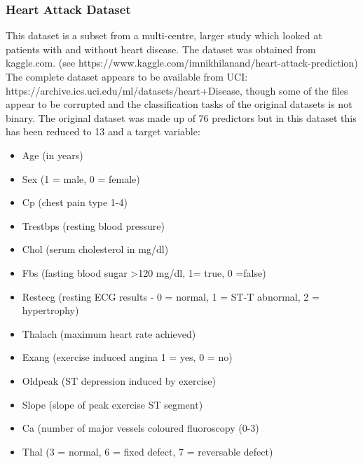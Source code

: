 \subsubsection{Heart Attack Dataset}
This dataset is a subset from a multi-centre, larger study which looked at patients with and without heart disease. The dataset was obtained from kaggle.com.\newline 
(see https://www.kaggle.com/imnikhilanand/heart-attack-prediction) \newline
The complete dataset appears to be available from UCI:\newline
https://archive.ics.uci.edu/ml/datasets/heart+Disease, \newline 
though some of the files appear to be corrupted and the classification tasks of the original datasets is not binary.
The original dataset was made up of 76 predictors but in this dataset this has been reduced to 13 and a target variable:
\begin{itemize}
    \item Age (in years)
    \item Sex (1 = male, 0 = female) 
    \item Cp (chest pain type 1-4)
    \item Trestbps (resting blood pressure)
    \item Chol (serum cholesterol in mg/dl) 
    \item Fbs (fasting blood sugar >120 mg/dl, 1= true, 0 =false) 
    \item Restecg (resting ECG results - 0 = normal, 1 = ST-T abnormal, 2 = hypertrophy)
    \item Thalach (maximum heart rate achieved)
    \item Exang (exercise induced angina 1 = yes, 0 = no)
    \item Oldpeak (ST depression induced by exercise)
    \item Slope (slope of peak exercise ST segment)
    \item Ca (number of major vessels coloured fluoroscopy (0-3) 
    \item Thal (3 = normal, 6 = fixed defect, 7 = reversable defect) 
\end{itemize}

